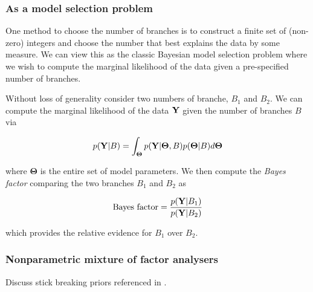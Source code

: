 \subsubsection{As a model selection problem}

One method to choose the number of branches is to construct a finite set of (non-zero) integers and choose the number that best explains the data by some measure. We can view this as the classic Bayesian model selection problem where we wish to compute the marginal likelihood of the data given a pre-specified number of branches.

Without loss of generality consider two numbers of branche, $B_1$ and $B_2$. We can compute the marginal likelihood of the data ${\bf Y}$ given the number of branches $B$ via

\begin{equation}
	p({\bf Y} | B) = \int_{\bm \Theta} p({\bf Y} | \bm \Theta, B) p (\bm \Theta | B) d \bm\Theta
\end{equation}

where $\bm \Theta$ is the entire set of model parameters. We then compute the \emph{Bayes factor} comparing the two branches $B_1$ and $B_2$ as

\begin{equation}
	\text{Bayes factor} = \frac{p({\bf Y} | B_1)}{p({\bf Y} | B_2)}
\end{equation}

which provides the relative evidence for $B_1$ over $B_2$.

\subsubsection{Nonparametric mixture of factor analysers}

Discuss stick breaking priors referenced in \cite{lonnberg2016temporal}.

